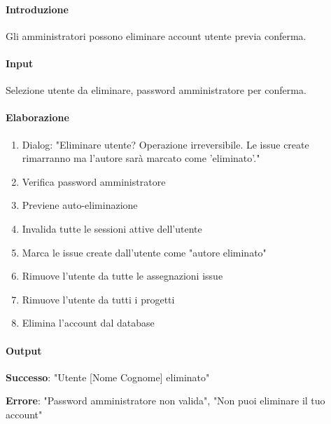 \begin{reqbox}[title=REQ-FUN-23: Rimozione Utenze (solo Admin)]
\label{subsubsec:req-rimozione-utenze}

\paragraph{Introduzione}
Gli amministratori possono eliminare account utente previa conferma.

\paragraph{Input}
Selezione utente da eliminare, password amministratore per conferma.

\paragraph{Elaborazione}
\begin{enumerate}[leftmargin=1.1em]
\item Dialog: "Eliminare utente? Operazione irreversibile. Le issue create rimarranno ma l'autore sarà marcato come 'eliminato'."
\item Verifica password amministratore
\item Previene auto-eliminazione
\item Invalida tutte le sessioni attive dell'utente
\item Marca le issue create dall'utente come "autore eliminato"
\item Rimuove l'utente da tutte le assegnazioni issue
\item Rimuove l'utente da tutti i progetti
\item Elimina l'account dal database
\end{enumerate}

\paragraph{Output}
\textbf{Successo}: "Utente [Nome Cognome] eliminato"

\textbf{Errore}: "Password amministratore non valida", "Non puoi eliminare il tuo account"

\end{reqbox}

\vspace{0.5cm}

\newpage


